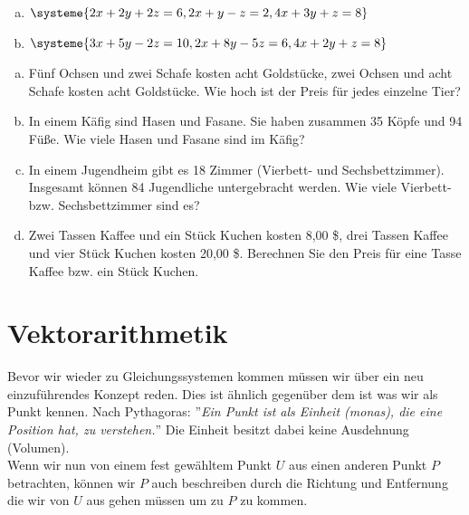 \documentclass[a4paper,12pt]{article}
\newcommand{\Aufgabe}[2]{
	{
		\vspace*{0.3cm}
		\begin{tcolorbox}[breakable,colback=yellow!0,colframe=black!65!white,title=\textbf{Aufgabe #1:},width=\linewidth ]
			{#2}
		\end{tcolorbox}
		
		
	}
}
\begin{document}
\Aufgabe{2.6.3 (Untersuche auf Lösbarkeit und gib die Lösungsmenge an)}{
	\begin{multicols}{2}
		\begin{enumerate}[(a)]
			\item $\systeme{ 2x + 2y + 2z = 6,
							2x + y - z = 2,
							4x + 3y + z = 8}$
			\item $\systeme{3x + 5y - 2z = 10,
							2x + 8y - 5z = 6,
							4x + 2y + z = 8}$
		\end{enumerate}
	\end{multicols}
}
\Aufgabe{2.6.4 (Löse die Textaufgaben mittels Gleichungssystem)}{
	\begin{multicols}{2}
		\begin{enumerate}[(a)]
			\item Fünf Ochsen und zwei Schafe kosten acht Goldstücke, zwei Ochsen und acht Schafe kosten acht Goldstücke. Wie hoch ist der Preis für jedes einzelne Tier?
			\item In einem Käfig sind Hasen und Fasane. Sie haben zusammen 35 Köpfe und 94 Füße. Wie viele Hasen und Fasane sind im Käfig?
			\item In einem Jugendheim gibt es 18 Zimmer (Vierbett- und Sechsbettzimmer). Insgesamt können 84 Jugendliche untergebracht werden. Wie viele Vierbett- bzw. Sechsbettzimmer	sind es?
			\item Zwei Tassen Kaffee und ein Stück Kuchen kosten 8,00 \$, drei Tassen Kaffee und vier Stück Kuchen kosten 20,00 \$. Berechnen Sie den Preis für eine Tasse Kaffee bzw. ein	Stück Kuchen.
		\end{enumerate}
	\end{multicols}
}
\newpage
	\section{Vektorarithmetik}
	Bevor wir wieder zu Gleichungssystemen kommen müssen wir über ein neu einzuführendes Konzept reden. Dies ist ähnlich gegenüber dem ist was wir als Punkt kennen. Nach Pythagoras: ''\textit{Ein Punkt ist als Einheit (monas), die eine Position hat, zu verstehen.}'' Die Einheit besitzt dabei keine Ausdehnung (Volumen).\\
	Wenn wir nun von einem fest gewähltem Punkt $U$ aus einen anderen Punkt $P$ betrachten, können wir $P$ auch beschreiben durch die Richtung und Entfernung die wir von $U$ aus gehen müssen um zu $P$ zu kommen. 
\end{document}
